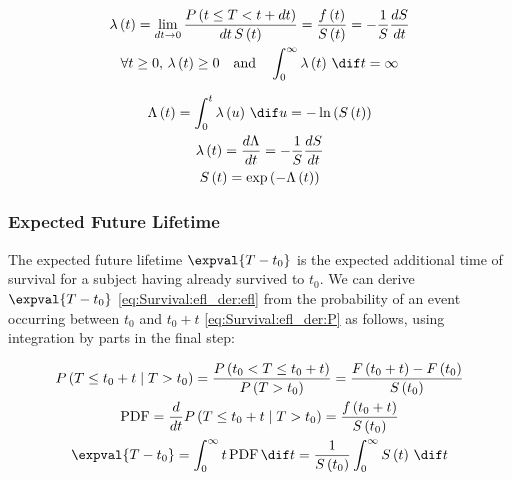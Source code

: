 \begin{subequations}\label{eq:Survival:hazard}
\begin{gather}
\lambda\left(t\right)
= \lim_{dt \to 0} \frac{P\left(t \leq T < t + dt\right)}{dt \, S\left(t\right)}
= \frac{f\left(t\right)}{S\left(t\right)} = -\frac{1}{S} \frac{dS}{dt} \label{eq:Survival:hazard:def} \\
\forall t \geq 0, \, \lambda\left(t\right) \geq 0 \quad \text{and} \quad \int_{0}^{\infty} \lambda\left(t\right) \, \dif t = \infty \label{eq:Survival:hazard:cond}
\end{gather}
\end{subequations}

\begin{subequations}\label{eq:Survival:cum_hazard}
\begin{gather}
\Lambda\left(t\right) = \int_{0}^{t} \lambda\left(u\right) \, \dif u = - \ln\left(S\left(t\right)\right) \label{eq:Survival:cum_hazard:def} \\
\lambda\left(t\right) = \frac{d\Lambda}{dt} = -\frac{1}{S} \frac{dS}{dt} \label{eq:Survival:cum_hazard:to_lambda} \\
S\left(t\right) = \exp\left(-\Lambda\left(t\right)\right) \label{eq:Survival:cum_hazard:to_S}
\end{gather}
\end{subequations}

\subsubsection{Expected Future Lifetime}
\label{additional:Survival:Nomenclature:efl}
The expected future lifetime $\expval{T-t_{0}}$ is the
expected additional time of survival for a subject having already survived to $t_{0}$.
We can derive $\expval{T-t_{0}}$ \cref{eq:Survival:efl_der:efl}
from the probability of an event occurring between $t_{0}$ and $t_{0} + t$ \cref{eq:Survival:efl_der:P}
as follows, using integration by parts in the final step:

\begin{subequations}\label{eq:Survival:efl_der}
\begin{gather}
P\left(T \leq t_{0} + t \mid T > t_{0}\right)
= \frac{P\left(t_{0} < T \leq t_{0} + t\right)}{P\left(T > t_{0}\right)}
= \frac{F\left(t_{0} + t\right) - F\left(t_{0}\right)}{S\left(t_{0}\right)} \label{eq:Survival:efl_der:P} \\
\text{PDF}
= \frac{d}{dt} P\left(T \leq t_{0} + t \mid T > t_{0}\right)
= \frac{f\left(t_{0} + t\right)}{S\left(t_{0}\right)} \label{eq:Survival:efl_der:pdf} \\
\expval{T-t_{0}}
= \int_{0}^{\infty} t \, \text{PDF} \, \dif t
= \frac{1}{S\left(t_{0}\right)} \int_{0}^{\infty} S\left(t\right) \, \dif t \label{eq:Survival:efl_der:efl}
\end{gather}
\end{subequations}

